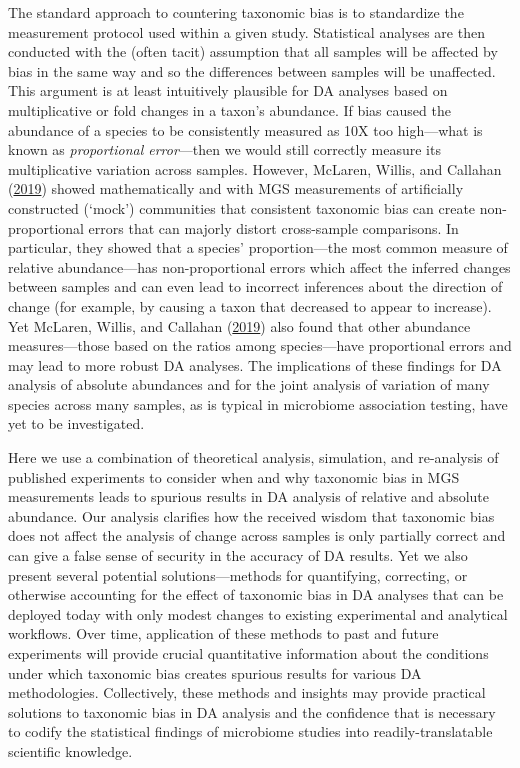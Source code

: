 \documentclass[
]{article}
\begin{document}
The standard approach to countering taxonomic bias is to standardize the measurement protocol used within a given study.
Statistical analyses are then conducted with the (often tacit) assumption that all samples will be affected by bias in the same way and so the differences between samples will be unaffected.
This argument is at least intuitively plausible for DA analyses based on multiplicative or fold changes in a taxon's abundance.
If bias caused the abundance of a species to be consistently measured as 10X too high---what is known as \emph{proportional error}---then we would still correctly measure its multiplicative variation across samples.
However, McLaren, Willis, and Callahan (\protect\hyperlink{ref-mclaren2019cons}{2019}) showed mathematically and with MGS measurements of artificially constructed (`mock') communities that consistent taxonomic bias can create non-proportional errors that can majorly distort cross-sample comparisons.
In particular, they showed that a species' proportion---the most common measure of relative abundance---has non-proportional errors which affect the inferred changes between samples and can even lead to incorrect inferences about the direction of change (for example, by causing a taxon that decreased to appear to increase).
Yet McLaren, Willis, and Callahan (\protect\hyperlink{ref-mclaren2019cons}{2019}) also found that other abundance measures---those based on the ratios among species---have proportional errors and may lead to more robust DA analyses.
The implications of these findings for DA analysis of absolute abundances and for the joint analysis of variation of many species across many samples, as is typical in microbiome association testing, have yet to be investigated.

Here we use a combination of theoretical analysis, simulation, and re-analysis of published experiments to consider when and why taxonomic bias in MGS measurements leads to spurious results in DA analysis of relative and absolute abundance.
Our analysis clarifies how the received wisdom that taxonomic bias does not affect the analysis of change across samples is only partially correct and can give a false sense of security in the accuracy of DA results.
Yet we also present several potential solutions---methods for quantifying, correcting, or otherwise accounting for the effect of taxonomic bias in DA analyses that can be deployed today with only modest changes to existing experimental and analytical workflows.
Over time, application of these methods to past and future experiments will provide crucial quantitative information about the conditions under which taxonomic bias creates spurious results for various DA methodologies.
Collectively, these methods and insights may provide practical solutions to taxonomic bias in DA analysis and the confidence that is necessary to codify the statistical findings of microbiome studies into readily-translatable scientific knowledge.
\end{document}
